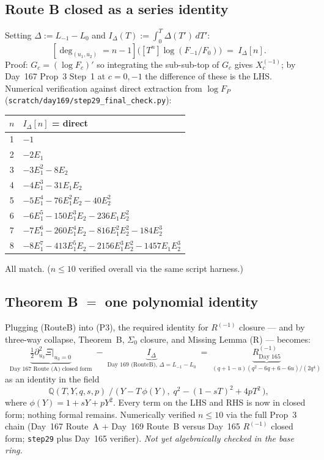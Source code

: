 \documentclass[11pt]{amsart}
\newcommand{\Rminus}{R^{(-1)}}
\newcommand{\deghom}[1]{[\deg_{(u_1,u_2)} = #1]}
\begin{document}
\subsection{Route B closed as a series identity}

Setting $\Delta := L_{-1} - L_0$ and $I_\Delta(T) := \int_0^T \Delta(T')\,dT'$:
\begin{equation}
\boxed{\;\;\deghom{n-1}\!\bigl([T^n]\log(F_{-1}/F_0)\bigr) \;=\; I_\Delta[n].\;\;} \tag{RouteB}
\end{equation}
Proof: $G_c = (\log F_c)'$ so integrating the sub-sub-top of $G_c$ gives
$X^{(-1)}_c$; by Day~167 Prop~3 Step~1 at $c = 0, -1$ the difference of
these is the LHS. Numerical verification against direct extraction from
$\log F_P$ (\texttt{scratch/day169/step29\_final\_check.py}):
\begin{center}
\begin{tabular}{c|l}
$n$ & $I_\Delta[n]$ = direct \\
\hline
1 & $-1$ \\
2 & $-2 E_1$ \\
3 & $-3 E_1^2 - 8 E_2$ \\
4 & $-4 E_1^3 - 31 E_1 E_2$ \\
5 & $-5 E_1^4 - 76 E_1^2 E_2 - 40 E_2^2$ \\
6 & $-6 E_1^5 - 150 E_1^3 E_2 - 236 E_1 E_2^2$ \\
7 & $-7 E_1^6 - 260 E_1^4 E_2 - 816 E_1^2 E_2^2 - 184 E_2^3$ \\
8 & $-8 E_1^7 - 413 E_1^5 E_2 - 2156 E_1^3 E_2^2 - 1457 E_1 E_2^3$ \\
\end{tabular}
\end{center}
All match. ($n \le 10$ verified overall via the same script harness.)

\subsection{Theorem B $=$ one polynomial identity}

Plugging (RouteB) into (P3), the required identity for
$R^{(-1)}$ closure --- and by three-way collapse, Theorem~B,
$\Sigma_0$ closure, and Missing Lemma (R) --- becomes:
\begin{equation}
\boxed{\;\;
\underbrace{\tfrac{1}{2} \partial_{u_3}^2 \Xi\big|_{u_3=0}}_{\text{Day 167 Route (A) closed form}}
\;-\; \underbrace{I_\Delta}_{\text{Day 169 (RouteB), } \Delta = L_{-1} - L_0}
\;=\; \underbrace{\Rminus_{\text{Day 165}}}_{(q + 1 - u)(q^2 - 6q + 6 - 6u)/(2 q^4)}
\;\;} \tag{$\heartsuit$}
\end{equation}
as an identity in the field
\[
\mathbb{Q}(T, Y, q, s, p) \;/\; \bigl(\,Y - T\,\phi(Y),\; q^2 - (1 - sT)^2 + 4 p T^2\,\bigr),
\]
where $\phi(Y) = 1 + s Y + p Y^2$. Every term on the LHS and RHS is now in
closed form; nothing formal remains. Numerically verified $n \le 10$
via the full Prop~3 chain (Day~167 Route~A + Day~169 Route~B versus Day~165
$\Rminus$ closed form; \texttt{step29} plus Day~165 verifier). \emph{Not yet
algebraically checked in the base ring.}
\end{document}
